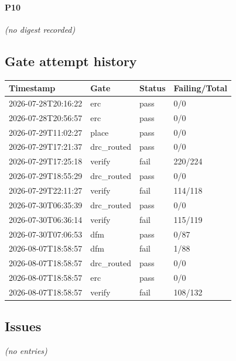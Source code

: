\documentclass[11pt,a4paper]{article}
\begin{document}
\paragraph*{P10}
\emph{(no digest recorded)}
\subsection*{Gate attempt history}
{\small
\begin{longtable}{llll}
\toprule
\textbf{Timestamp} & \textbf{Gate} & \textbf{Status} & \textbf{Failing/Total} \\
\midrule
\endhead
2026-07-28T20:16:22 & erc & pass & 0/0 \\
2026-07-28T20:56:57 & erc & pass & 0/0 \\
2026-07-29T11:02:27 & place & pass & 0/0 \\
2026-07-29T17:21:37 & drc\_routed & pass & 0/0 \\
2026-07-29T17:25:18 & verify & fail & 220/224 \\
2026-07-29T18:55:29 & drc\_routed & pass & 0/0 \\
2026-07-29T22:11:27 & verify & fail & 114/118 \\
2026-07-30T06:35:39 & drc\_routed & pass & 0/0 \\
2026-07-30T06:36:14 & verify & fail & 115/119 \\
2026-07-30T07:06:53 & dfm & pass & 0/87 \\
2026-08-07T18:58:57 & dfm & fail & 1/88 \\
2026-08-07T18:58:57 & drc\_routed & pass & 0/0 \\
2026-08-07T18:58:57 & erc & pass & 0/0 \\
2026-08-07T18:58:57 & verify & fail & 108/132 \\
\bottomrule
\end{longtable}
}
\subsection*{Issues}
\emph{(no entries)}
\end{document}
